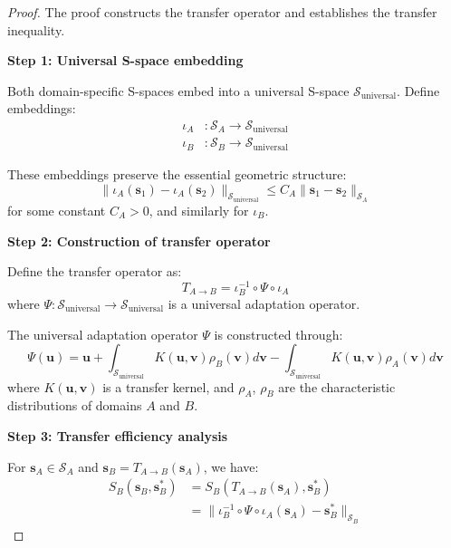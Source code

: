\documentclass[12pt,a4paper]{article}
\begin{document}
\begin{proof}
The proof constructs the transfer operator and establishes the transfer inequality.

\textbf{Step 1: Universal S-space embedding}

Both domain-specific S-spaces embed into a universal S-space $\mathcal{S}_{\text{universal}}$. Define embeddings:
\begin{align}
\iota_A &: \mathcal{S}_A \to \mathcal{S}_{\text{universal}}\\
\iota_B &: \mathcal{S}_B \to \mathcal{S}_{\text{universal}}
\end{align}

These embeddings preserve the essential geometric structure:
\begin{equation}
\|\iota_A(\mathbf{s}_1) - \iota_A(\mathbf{s}_2)\|_{\mathcal{S}_{\text{universal}}} \leq C_A \|\mathbf{s}_1 - \mathbf{s}_2\|_{\mathcal{S}_A}
\end{equation}
for some constant $C_A > 0$, and similarly for $\iota_B$.

\textbf{Step 2: Construction of transfer operator}

Define the transfer operator as:
\begin{equation}
T_{A \to B} = \iota_B^{-1} \circ \Psi \circ \iota_A
\end{equation}
where $\Psi: \mathcal{S}_{\text{universal}} \to \mathcal{S}_{\text{universal}}$ is a universal adaptation operator.

The universal adaptation operator $\Psi$ is constructed through:
\begin{equation}
\Psi(\mathbf{u}) = \mathbf{u} + \int_{\mathcal{S}_{\text{universal}}} K(\mathbf{u}, \mathbf{v}) \rho_B(\mathbf{v}) d\mathbf{v} - \int_{\mathcal{S}_{\text{universal}}} K(\mathbf{u}, \mathbf{v}) \rho_A(\mathbf{v}) d\mathbf{v}
\end{equation}
where $K(\mathbf{u}, \mathbf{v})$ is a transfer kernel, and $\rho_A$, $\rho_B$ are the characteristic distributions of domains $A$ and $B$.

\textbf{Step 3: Transfer efficiency analysis}

For $\mathbf{s}_A \in \mathcal{S}_A$ and $\mathbf{s}_B = T_{A \to B}(\mathbf{s}_A)$, we have:
\begin{align}
S_B(\mathbf{s}_B, \mathbf{s}_B^*) &= S_B(T_{A \to B}(\mathbf{s}_A), \mathbf{s}_B^*)\\
&= \|\iota_B^{-1} \circ \Psi \circ \iota_A(\mathbf{s}_A) - \mathbf{s}_B^*\|_{\mathcal{S}_B}
\end{align}


\end{proof}
\end{document}
